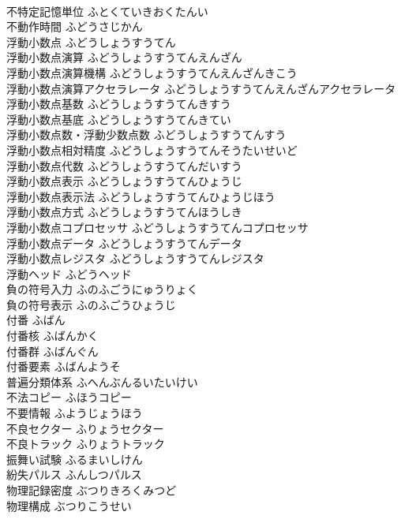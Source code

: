 \documentclass[8pt]{extreport}
\begin{document}
\begin{CJK}{UTF8}{min}
\\	不特定記憶単位	ふとくていきおくたんい	
\\	不動作時間	ふどうさじかん	
\\	浮動小数点	ふどうしょうすうてん	
\\	浮動小数点演算	ふどうしょうすうてんえんざん	
\\	浮動小数点演算機構	ふどうしょうすうてんえんざんきこう	
\\	浮動小数点演算アクセラレータ	ふどうしょうすうてんえんざんアクセラレータ	
\\	浮動小数点基数	ふどうしょうすうてんきすう	
\\	浮動小数点基底	ふどうしょうすうてんきてい	
\\	浮動小数点数・浮動少数点数	ふどうしょうすうてんすう	
\\	浮動小数点相対精度	ふどうしょうすうてんそうたいせいど	
\\	浮動小数点代数	ふどうしょうすうてんだいすう	
\\	浮動小数点表示	ふどうしょうすうてんひょうじ	
\\	浮動小数点表示法	ふどうしょうすうてんひょうじほう	
\\	浮動小数点方式	ふどうしょうすうてんほうしき	
\\	浮動小数点コプロセッサ	ふどうしょうすうてんコプロセッサ	
\\	浮動小数点データ	ふどうしょうすうてんデータ	
\\	浮動小数点レジスタ	ふどうしょうすうてんレジスタ	
\\	浮動ヘッド	ふどうヘッド	
\\	負の符号入力	ふのふごうにゅうりょく	
\\	負の符号表示	ふのふごうひょうじ	
\\	付番	ふばん	
\\	付番核	ふばんかく	
\\	付番群	ふばんぐん	
\\	付番要素	ふばんようそ	
\\	普遍分類体系	ふへんぶんるいたいけい	
\\	不法コピー	ふほうコピー	
\\	不要情報	ふようじょうほう	
\\	不良セクター	ふりょうセクター	
\\	不良トラック	ふりょうトラック	
\\	振舞い試験	ふるまいしけん	
\\	紛失パルス	ふんしつパルス	
\\	物理記録密度	ぶつりきろくみつど	
\\	物理構成	ぶつりこうせい	

\end{CJK}
\end{document}

